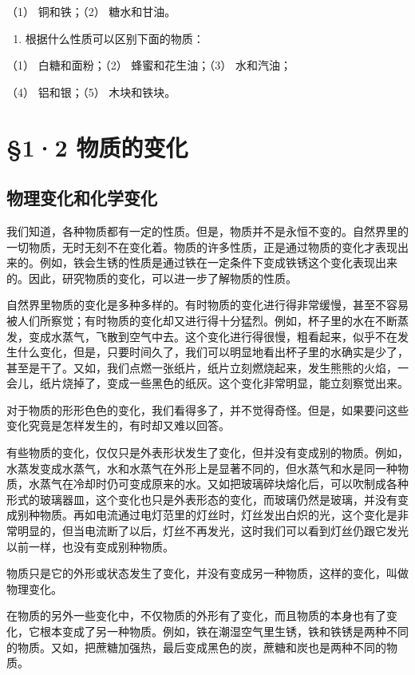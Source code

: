 （1） 铜和铁；（2） 糖水和甘油。

\begin{enumerate}[start=3]
\item
  根据什么性质可以区别下面的物质：
\end{enumerate}

（1） 白糖和面粉；（2） 蜂蜜和花生油；（3） 水和汽油；

（4） 铝和银；（5） 木块和铁块。

\section{§1·2 物质的变化}

\subsection{物理变化和化学变化}

我们知道，各种物质都有一定的性质。但是，物质并不是永恒不变的。自然界里的一切物质，无时无刻不在变化着。物质的许多性质，正是通过物质的变化才表现出来的。例如，铁会生锈的性质是通过铁在一定条件下变成铁锈这个变化表现出来的。因此，研究物质的变化，可以进一步了解物质的性质。

自然界里物质的变化是多种多样的。有时物质的变化进行得非常缓慢，甚至不容易被人们所察觉；有时物质的变化却又进行得十分猛烈。例如，杯子里的水在不断蒸发，变成水蒸气，飞散到空气中去。这个变化进行得很慢，粗看起来，似乎不在发生什么变化，但是，只要时间久了，我们可以明显地看出杯子里的水确实是少了，甚至是干了。又如，我们点燃一张纸片，纸片立刻燃烧起来，发生熊熊的火焰，一会儿，纸片烧掉了，变成一些黑色的纸灰。这个变化非常明显，能立刻察觉出来。

对于物质的形形色色的变化，我们看得多了，并不觉得奇怪。但是，如果要问这些变化究竟是怎样发生的，有时却又难以回答。

有些物质的变化，仅仅只是外表形状发生了变化，但并没有变成别的物质。例如，水蒸发变成水蒸气，水和水蒸气在外形上是显著不同的，但水蒸气和水是同一种物质，水蒸气在冷却时仍可变成原来的水。又如把玻璃碎块熔化后，可以吹制成各种形式的玻璃器皿，这个变化也只是外表形态的变化，而玻璃仍然是玻璃，并没有变成别种物质。再如电流通过电灯范里的灯丝时，灯丝发出白炽的光，这个变化是非常明显的，但当电流断了以后，灯丝不再发光，这时我们可以看到灯丝仍跟它发光以前一样，也没有变成别种物质。

物质只是它的外形或状态发生了变化，并没有变成另一种物质，这样的变化，叫做物理变化。

在物质的另外一些变化中，不仅物质的外形有了变化，而且物质的本身也有了变化，它根本变成了另一种物质。例如，铁在潮湿空气里生锈，铁和铁锈是两种不同的物质。又如，把蔗糖加强热，最后变成黑色的炭，蔗糖和炭也是两种不同的物质。

